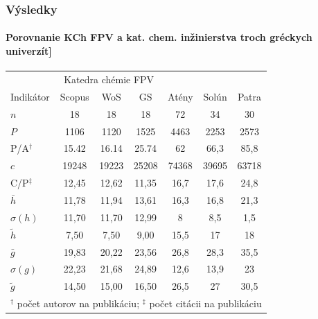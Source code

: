 \documentclass{beamer}
\begin{document}
\begin{frame}
  \frametitle{Výsledky}
  \framesubtitle{Porovnanie KCh FPV a kat. chem. inžinierstva  troch gréckych univerzít]}

  \begin{table}
    \centering\small
    \begin{tabular}{lcccccc}
      \toprule\noalign{\vspace{.3ex}}
       & \multicolumn{3}{c}{Katedra chémie FPV} & \multicolumn{3}{c}{\citet{Kazakis2015}}  \\
       Indikátor & Scopus & WoS   & GS    &  Atény     & Solún      & Patra      \\[0.3ex]
      \midrule\noalign{\vspace{.5ex}}
       $n$         & 18     & 18    & 18    & 72    & 34    & 30    \\
       $P$         & 1106   & 1120  & 1525  & 4463  & 2253  & 2573  \\
       P/A$^\dagger$         & 15.42  & 16.14 & 25.74 & 62    & 66,3  & 85,8  \\
       $c$         & 19248  & 19223 & 25208 & 74368 & 39695 & 63718 \\
       C/P$^\ddagger$         & 12,45  & 12,62 & 11,35 & 16,7  & 17,6  & 24,8  \\[1ex]
       $\bar{h}$   & 11,78  & 11,94 & 13,61 & 16,3  & 16,8  & 21,3  \\
       $\sigma (h)$ & 11,70  & 11,70 & 12,99 & 8     & 8,5   & 1,5   \\
       $\tilde{h}$ & 7,50   & 7,50  & 9,00  & 15,5  & 17    & 18    \\
       $\bar{g}$   & 19,83  & 20,22 & 23,56 & 26,8  & 28,3  & 35,5  \\
       $\sigma (g)$  & 22,23  & 21,68 & 24,89 & 12,6  & 13,9  & 23    \\
       $\tilde{g}$  & 14,50  & 15,00 & 16,50 & 26,5  & 27    & 30,5  \\[0.5ex]
      \bottomrule
      \multicolumn{7}{l}{\footnotesize $^\dagger$ počet autorov na publikáciu; $^\ddagger$ počet citácii na publikáciu} \\
    \end{tabular}
  \end{table}
\end{frame}
\end{document}
